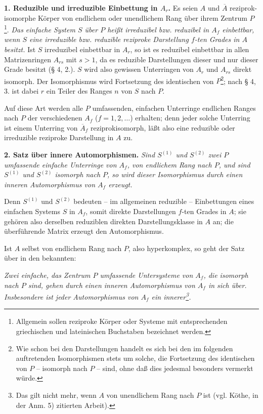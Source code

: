 \noindent\textbf{1. Reduzible und irreduzible Einbettung in \(A_r\).} Es seien \(A\) und \(\overline A\) reziprok-isomorphe Körper von endlichem oder unendlichem Rang über ihrem Zentrum \(P\)\footnote{Allgemein sollen reziproke Körper oder Systeme mit entsprechenden griechischen und lateinischen Buchstaben bezeichnet werden.}. \emph{Das einfache System \(S\) über \(P\) heißt irreduzibel bzw. reduzibel in \(A_f\) einbettbar, wenn \(S\) eine irreduzible bzw. reduzible reziproke Darstellung \(f\)-ten Grades in \(A\) besitzt.} Ist \(S\) irreduzibel einbettbar in \(A_r\), so ist es reduzibel einbettbar in allen Matrizenringen \(A_{rs}\) mit \(s>1\), da es reduzible Darstellungen dieser und nur dieser Grade besitzt (§ 4, 2.). \(S\) wird also gewissen Unterringen von \(A_r\) und \(A_{rs}\) direkt isomorph. Der Isomorphismus wird Fortsetzung des identischen von \(P\)\footnote{Wie schon bei den Darstellungen handelt es sich bei den im folgenden auftretenden Isomorphismen stets um solche, die Fortsetzung des identischen von \(P\) -- isomorph nach \(P\) -- sind, ohne daß dies jedesmal besonders vermerkt würde.}; nach § 4, 3. ist dabei \(r\) ein Teiler des Ranges \(n\) von \(S\) nach \(P\).

Auf diese Art werden alle \(P\) umfassenden, einfachen Unterringe endlichen Ranges nach \(P\) der verschiedenen \(A_f\) (\(f=1,2,\ldots\)) erhalten; denn jeder solche Unterring ist einem Unterring von \(\overline A_f\) reziprokisomorph, läßt also eine reduzible oder irreduzible reziproke Darstellung in \(A\) zu.

\noindent\textbf{2. Satz über innere Automorphismen.} \emph{Sind \(S^{(1)}\) und \(S^{(2)}\) zwei \(P\) umfassende einfache Unterringe von \(A_f\), von endlichem Rang nach \(P\), und sind \(S^{(1)}\) und \(S^{(2)}\) isomorph nach \(P\), so wird dieser Isomorphismus durch einen inneren Automorphismus von \(A_f\) erzeugt.}

Denn \(S^{(1)}\) und \(S^{(2)}\) bedeuten -- im allgemeinen reduzible -- Einbettungen eines einfachen Systems \(S\) in \(A_f\), somit direkte Darstellungen \(f\)-ten Grades in \(A\); sie gehören also derselben reduziblen direkten Darstellungsklasse in \(A\) an; die überführende Matrix erzeugt den Automorphismus.

Ist \(A\) selbst von endlichem Rang nach \(P\), also hyperkomplex, so geht der Satz über in den bekannten:

\emph{Zwei einfache, das Zentrum \(P\) umfassende Untersysteme von \(A_f\), die isomorph nach \(P\) sind, gehen durch einen inneren Automorphismus von \(A_f\) in sich über. Insbesondere ist jeder Automorphismus von \(A_f\) ein innerer\footnote{\normalfont Das gilt nicht mehr, wenn \(A\) von unendlichem Rang nach \(P\) ist (vgl. Köthe, in der Anm. 5) zitierten Arbeit).}.}


